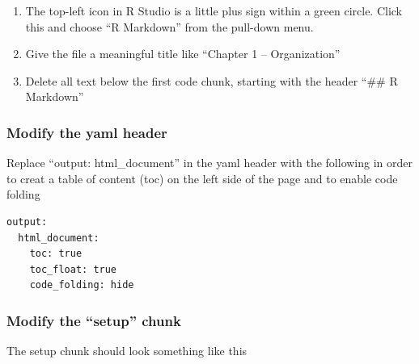 \documentclass[]{book}
\providecommand{\tightlist}{%
  \setlength{\itemsep}{0pt}\setlength{\parskip}{0pt}}
\begin{document}
\begin{enumerate}
\def\labelenumi{\arabic{enumi}.}
\tightlist
\item
  The top-left icon in R Studio is a little plus sign within a green circle. Click this and choose ``R Markdown'' from the pull-down menu.
\item
  Give the file a meaningful title like ``Chapter 1 -- Organization''
\item
  Delete all text below the first code chunk, starting with the header ``\#\# R Markdown''
\end{enumerate}

\hypertarget{modify-the-yaml-header}{%
\subsubsection{Modify the yaml header}\label{modify-the-yaml-header}}

Replace ``output: html\_document'' in the yaml header with the following in order to creat a table of content (toc) on the left side of the page and to enable code folding

\begin{verbatim}
output:
  html_document:
    toc: true
    toc_float: true
    code_folding: hide
\end{verbatim}

\hypertarget{modify-the-setup-chunk}{%
\subsubsection{Modify the ``setup'' chunk}\label{modify-the-setup-chunk}}

The setup chunk should look something like this
\end{document}
